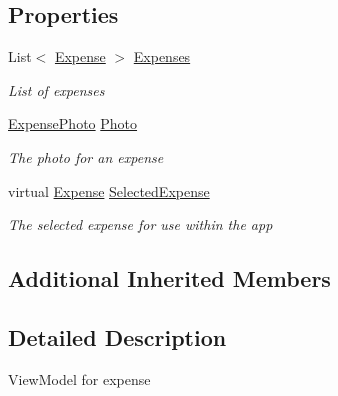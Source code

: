 \subsection*{Properties}
\begin{DoxyCompactItemize}
\item 
List$<$ \hyperlink{class_field_service_1_1_data_1_1_expense}{Expense} $>$ \hyperlink{class_field_service_1_1_view_models_1_1_expense_view_model_a53d14dbc33c8e46b1bacf134a51884f2}{Expenses}
\begin{DoxyCompactList}\small\item\em List of expenses \end{DoxyCompactList}\item 
\hyperlink{class_field_service_1_1_data_1_1_expense_photo}{Expense\+Photo} \hyperlink{class_field_service_1_1_view_models_1_1_expense_view_model_aa7bc8598a79bd22dfa19f9f91efd97b5}{Photo}
\begin{DoxyCompactList}\small\item\em The photo for an expense \end{DoxyCompactList}\item 
virtual \hyperlink{class_field_service_1_1_data_1_1_expense}{Expense} \hyperlink{class_field_service_1_1_view_models_1_1_expense_view_model_a6ddce22624d7e123f0342693798f171e}{Selected\+Expense}
\begin{DoxyCompactList}\small\item\em The selected expense for use within the app \end{DoxyCompactList}\end{DoxyCompactItemize}
\subsection*{Additional Inherited Members}


\subsection{Detailed Description}
View\+Model for expense 



